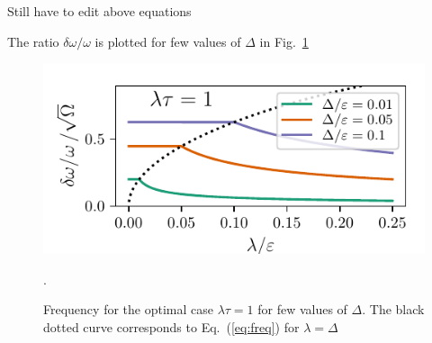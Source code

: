 {\color{blue} Still have to edit above equations}

The ratio $\delta\omega/\omega$ is plotted for few values of $\Delta$ in Fig.~\ref{fig:freqs}
\begin{figure}
    \centering
    \includegraphics{gfx/Chapter04/freq_plot.pdf}
    \caption{Frequency for the optimal case $\lambda\tau=1$ for few values of $\Delta$. The black dotted curve corresponds to Eq.~(\ref{eq:freq}) for $\lambda=\Delta$}. 
    \label{fig:freqs}
\end{figure}